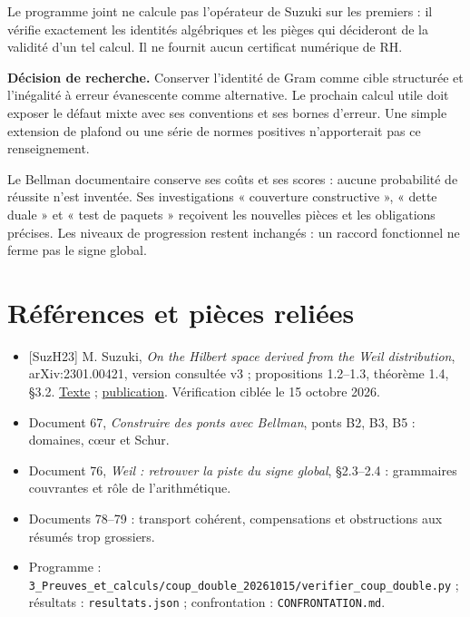 \documentclass[
  11pt,
]{article}
\providecommand{\tightlist}{%
  \setlength{\itemsep}{0pt}\setlength{\parskip}{0pt}}
\begin{document}
Le programme joint ne calcule pas l'opérateur de Suzuki sur les premiers
: il vérifie exactement les identités algébriques et les pièges qui
décideront de la validité d'un tel calcul. Il ne fournit aucun
certificat numérique de RH.

\textbf{Décision de recherche.} Conserver l'identité de Gram comme cible
structurée et l'inégalité à erreur évanescente comme alternative. Le
prochain calcul utile doit exposer le défaut mixte avec ses conventions
et ses bornes d'erreur. Une simple extension de plafond ou une série de
normes positives n'apporterait pas ce renseignement.

Le Bellman documentaire conserve ses coûts et ses scores : aucune
probabilité de réussite n'est inventée. Ses investigations « couverture
constructive », « dette duale » et « test de paquets » reçoivent les
nouvelles pièces et les obligations précises. Les niveaux de progression
restent inchangés : un raccord fonctionnel ne ferme pas le signe global.

\hypertarget{ruxe9fuxe9rences-et-piuxe8ces-reliuxe9es}{%
\section{Références et pièces
reliées}\label{ruxe9fuxe9rences-et-piuxe8ces-reliuxe9es}}

\begin{itemize}
\tightlist
\item
  {[}SuzH23{]} M. Suzuki, \emph{On the Hilbert space derived from the
  Weil distribution}, arXiv:2301.00421, version consultée v3 ;
  propositions 1.2--1.3, théorème 1.4, §3.2.
  \href{https://arxiv.org/html/2301.00421v3}{Texte} ;
  \href{https://www.cambridge.org/core/journals/canadian-journal-of-mathematics/article/on-the-hilbert-space-derived-from-the-weil-distribution/FD33EBD117A6B448053450DD8D62ADB6}{publication}.
  Vérification ciblée le 15 octobre 2026.
\item
  Document 67, \emph{Construire des ponts avec Bellman}, ponts B2, B3,
  B5 : domaines, cœur et Schur.
\item
  Document 76, \emph{Weil : retrouver la piste du signe global},
  §2.3--2.4 : grammaires couvrantes et rôle de l'arithmétique.
\item
  Documents 78--79 : transport cohérent, compensations et obstructions
  aux résumés trop grossiers.
\item
  Programme :
  \texttt{3\_Preuves\_et\_calculs/coup\_double\_20261015/verifier\_coup\_double.py}
  ; résultats : \texttt{resultats.json} ; confrontation :
  \texttt{CONFRONTATION.md}.
\end{itemize}
\end{document}

